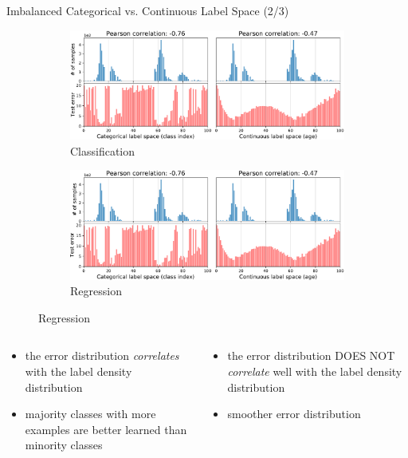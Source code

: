 \begin{frame}{Imbalanced Categorical vs. Continuous Label Space (2/3)}
	\vspace{-2em}
	\begin{figure}[h]
		\begin{subfigure}{0.48\textwidth}
			\includegraphics[width=\linewidth]{images/err_motivate_1_left.pdf}
			\caption{Classification}
		\end{subfigure}\hspace{1em}%
		\begin{subfigure}{0.44\textwidth}
			\includegraphics[width=\linewidth]{images/err_motivate_1_right.pdf}
			\caption{Regression}
		\end{subfigure}
	\end{figure}
	\footnotesize
	\vspace{-.5em}
	\begin{columns}
		\begin{column}{0.5\textwidth}
			\begin{itemize}
				\item the error distribution \emph{correlates} with the label density distribution
				\item majority classes with more examples are better learned than minority classes
			\end{itemize}
		\end{column}
		\begin{column}{0.5\textwidth}
			\begin{itemize}
				\item the error distribution DOES NOT \emph{correlate} well with the label density distribution
				\item smoother error distribution
			\end{itemize}
		\end{column}
	\end{columns}
\end{frame}


